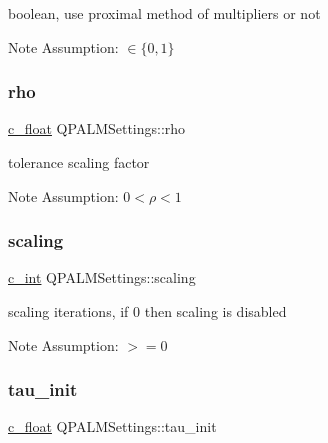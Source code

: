 boolean, use proximal method of multipliers or not 

\begin{DoxyNote}{Note}
Assumption\+: $\in \{0,1\}$ 
\end{DoxyNote}
\mbox{\label{structQPALMSettings_a39d647ae87752808f0a33ab020dd0591}} 
\subsubsection{\texorpdfstring{rho}{rho}}
{\footnotesize\ttfamily \mbox{\hyperlink{global__opts_8h_a7f1a9fda95e52979658c20a0d134fb15}{c\+\_\+float}} Q\+P\+A\+L\+M\+Settings\+::rho}



tolerance scaling factor 

\begin{DoxyNote}{Note}
Assumption\+: $0<\rho<1$ 
\end{DoxyNote}
\mbox{\label{structQPALMSettings_abe76ae92171f3a1e5e4dcc934d797ac7}} 
\subsubsection{\texorpdfstring{scaling}{scaling}}
{\footnotesize\ttfamily \mbox{\hyperlink{global__opts_8h_aa3217a0f49d3e52b74e9dd830c44472f}{c\+\_\+int}} Q\+P\+A\+L\+M\+Settings\+::scaling}



scaling iterations, if 0 then scaling is disabled 

\begin{DoxyNote}{Note}
Assumption\+: $>=0$ 
\end{DoxyNote}
\mbox{\label{structQPALMSettings_aea063df79b1f7d5fa38d0bf77c9e5d7a}} 
\subsubsection{\texorpdfstring{tau\_init}{tau\_init}}
{\footnotesize\ttfamily \mbox{\hyperlink{global__opts_8h_a7f1a9fda95e52979658c20a0d134fb15}{c\+\_\+float}} Q\+P\+A\+L\+M\+Settings\+::tau\+\_\+init}



